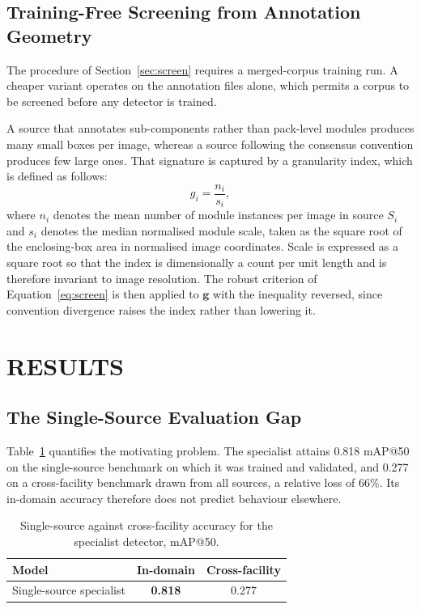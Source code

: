 \subsection{Training-Free Screening from Annotation Geometry}
\label{sec:screen-free}

\noindent The procedure of Section~\ref{sec:screen} requires a merged-corpus
training run. A cheaper variant operates on the annotation files alone, which
permits a corpus to be screened before any detector is trained.

A source that annotates sub-components rather than pack-level modules produces many
small boxes per image, whereas a source following the consensus convention produces
few large ones. That signature is captured by a granularity index, which is defined
as follows:
\begin{equation}
g_i = \frac{n_i}{s_i},
\label{eq:granularity}
\end{equation}
where $n_i$ denotes the mean number of module instances per image in source $S_i$
and $s_i$ denotes the median normalised module scale, taken as the square root of
the enclosing-box area in normalised image coordinates. Scale is expressed as a
square root so that the index is dimensionally a count per unit length and is
therefore invariant to image resolution. The robust criterion of
Equation~\ref{eq:screen} is then applied to $\mathbf{g}$ with the inequality
reversed, since convention divergence raises the index rather than lowering it.

\section{\uppercase{Results}}
\label{sec:results}

\subsection{The Single-Source Evaluation Gap}
\label{sec:res-gap}

\noindent Table~\ref{tab:gap} quantifies the motivating problem. The specialist attains
0.818 mAP@50 on the single-source benchmark on which it was trained and validated, and
0.277 on a cross-facility benchmark drawn from all sources, a relative loss of 66\%.
Its in-domain accuracy therefore does not predict behaviour elsewhere.

\begin{table}[t]
\caption{Single-source against cross-facility accuracy for the specialist detector,
mAP@50.}
\label{tab:gap}
\centering\small
\setlength{\tabcolsep}{3.5pt}
\begin{tabular}{lcc}
\hline
Model & In-domain & Cross-facility \\
\hline
Single-source specialist & \textbf{0.818} & 0.277 \\
\hline
\end{tabular}
\end{table}


